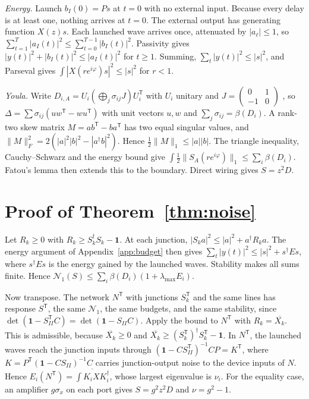 \documentclass[aps,pra,twocolumn,superscriptaddress,floatfix,nofootinbib]{revtex4-2}
\theoremstyle{definition}
\newcommand{\NN}{\mathcal N_1}
\newcommand{\one}{\mathbf 1}
\newcommand{\T}{\mathsf T}
\begin{document}
\emph{Energy.} Launch $b_I(0)=Ps$ at $t=0$ with no external input. Because every delay is at least one, nothing arrives at $t=0$. The external output has generating function $X(z)s$. Each launched wave arrives once, attenuated by $|a_\ell|\le1$, so $\sum_{t=1}^T|a_I(t)|^2\le\sum_{t=0}^{T-1}|b_I(t)|^2$. Passivity gives $|y(t)|^2+|b_I(t)|^2\le|a_I(t)|^2$ for $t\ge1$. Summing, $\sum_t|y(t)|^2\le|s|^2$, and Parseval gives $\int|X(re^{i\varphi})s|^2\le|s|^2$ for $r<1$.

\emph{Youla.} Write $D_{i,A}=U_i(\bigoplus_j\sigma_{ij}J)U_i^\T$ with $U_i$ unitary and $J=\left(\begin{smallmatrix}0&1\\-1&0\end{smallmatrix}\right)$ \cite{You61}, so $\Delta=\sum\sigma_{ij}(uw^\T-wu^\T)$ with unit vectors $u,w$ and $\sum_j\sigma_{ij}=\beta(D_i)$. A rank-two skew matrix $M=ab^\T-ba^\T$ has two equal singular values, and $\|M\|_F^2=2(|a|^2|b|^2-|a^\dagger b|^2)$. Hence $\frac12\|M\|_1\le|a||b|$. The triangle inequality, Cauchy--Schwarz and the energy bound give $\int\frac12\|S_A(re^{i\varphi})\|_1\le\sum_i\beta(D_i)$. Fatou's lemma then extends this to the boundary. Direct wiring gives $S=z^2D$.

\section{Proof of Theorem~\ref{thm:noise}}\label{app:noise}

Let $R_k\ge0$ with $R_k\ge S_k^\dagger S_k-\one$. At each junction, $|S_ka|^2\le|a|^2+a^\dagger R_ka$. The energy argument of Appendix~\ref{app:budget} then gives $\sum_t|y(t)|^2\le|s|^2+s^\dagger Es$, where $s^\dagger Es$ is the energy gained by the launched waves. Stability makes all sums finite. Hence $\NN(S)\le\sum_i\beta(D_i)(1+\lambda_{\max}E_i)$.

Now transpose. The network $N^\T$ with junctions $S_k^\T$ and the same lines has response $S^\T$, the same $\NN$, the same budgets, and the same stability, since $\det(\one-S_{II}^\T C)=\det(\one-S_{II}C)$. Apply the bound to $N^\T$ with $R_k=\overline{X_k}$. This is admissible, because $\overline{X_k}\ge0$ and $\overline{X_k}\ge(S_k^\T)^\dagger S_k^\T-\one$. In $N^\T$, the launched waves reach the junction inputs through $(\one-CS_{II}^\T)^{-1}CP=K^\T$, where $K=P^\T(\one-CS_{II})^{-1}C$ carries junction-output noise to the device inputs of $N$. Hence $E_i(N^\T)=\overline{\int K_iXK_i^\dagger}$, whose largest eigenvalue is $\nu_i$. For the equality case, an amplifier $g\sigma_x$ on each port gives $S=g^2z^2D$ and $\nu=g^2-1$.
\end{document}
